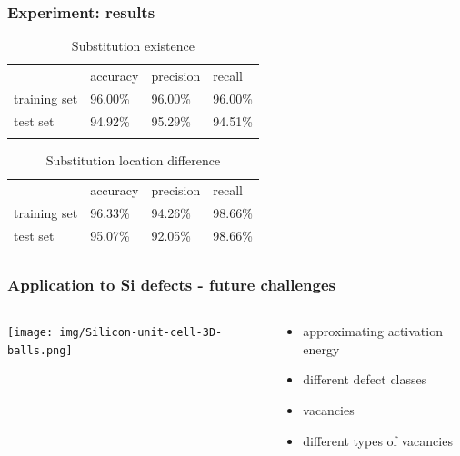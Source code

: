 \documentclass{beamer}
\begin{document}
\begin{frame}
\frametitle{Experiment: results}

\begin{table}[h!]
\begin{center}
\caption{Substitution existence}
\begin{tabular}{llll}
\hline\noalign{\smallskip}
 & accuracy & precision & recall\\
\noalign{\smallskip}
\hline
\noalign{\smallskip}
training set & 96.00\% &  96.00\% & 96.00\% \\
test set & 94.92\% & 95.29\% & 94.51\% \\
\hline
\label{tab:subst}
\end{tabular}
\end{center}
\end{table}

\begin{table}[h!]
\begin{center}
\caption{Substitution location difference}
\begin{tabular}{llll}
\hline\noalign{\smallskip}
 & accuracy & precision & recall\\
\noalign{\smallskip}
\hline
\noalign{\smallskip}
training set & 96.33\% &  94.26\% & 98.66\% \\
test set & 95.07\% & 92.05\% & 98.66\% \\
\hline
\label{tab:substloc}
\end{tabular}
\end{center}
\end{table}

\end{frame}

\begin{frame}
\frametitle{Application to Si defects - future challenges}
\begin{columns}
	\begin{column}{0.5\textwidth}
		\texttt{[image: img/Silicon-unit-cell-3D-balls.png]}
	\end{column}
	\begin{column}{0.5\textwidth}
		\begin{itemize}
			\item approximating activation energy
			\item different defect classes
			\item vacancies
			\item different types of vacancies
		\end{itemize}
	\end{column}
\end{columns}
\end{frame}
\end{document}
